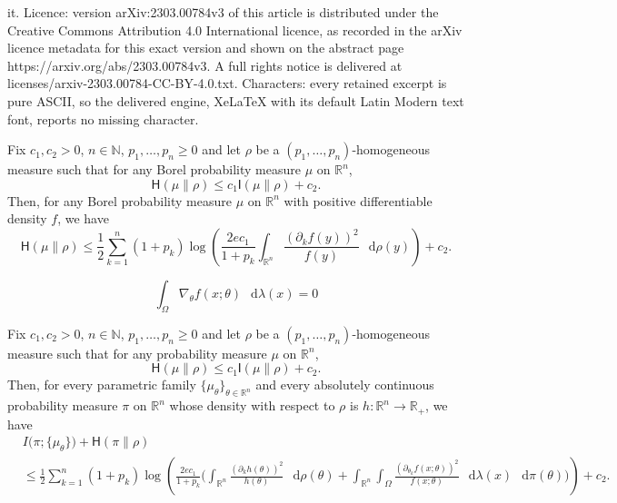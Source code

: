 \documentclass[10pt,a4paper]{amsart}
\newcommand*\diff{\mathop{}\!\mathrm{d}}
\newcommand{\HH}{\mathsf{H}}
\newcommand{\II}{\mathsf{I}}
\newcommand{\N}{\mathbb{N}}
\newcommand{\R}{\mathbb{R}} %
\begin{document}
it. Licence: version arXiv:2303.00784v3 of this article is distributed under the Creative Commons Attribution 4.0 International licence, as recorded in the arXiv licence metadata for this exact version and shown on the abstract page https://arxiv.org/abs/2303.00784v3. A full rights notice is delivered at licenses/arxiv-2303.00784-CC-BY-4.0.txt. Characters: every retained excerpt is pure ASCII, so the delivered engine, XeLaTeX with its default Latin Modern text font, reports no missing character.
\begin{theorem} \label{thm:homogeneous}
Fix $c_1,c_2>0$, $n\in\N$, $p_1,\ldots,p_n\geq0$ and let $\rho$ be a $(p_1,\ldots,p_n)$-homogeneous measure such that for any Borel probability measure $\mu$ on $\R^n$,
\begin{equation} \label{eq:homog-assumption}
\HH(\mu\|\rho)\leq c_1 \II(\mu\|\rho) + c_2.
\end{equation} 
Then, for any Borel probability measure $\mu$ on $\R^n$ with  positive differentiable density $f$, we have
\begin{equation}\label{eq:homog-conclusion}
\HH(\mu\|\rho)\leq  \frac{1}{2} \sum_{k=1}^n (1+p_k)  \log\left( \frac{2ec_1}{1+p_k} \int_{\R^n} \frac{(\partial_k f(y))^2}{f(y)} \,\diff\rho(y)\right) + c_2.
\end{equation}
\end{theorem}

\begin{equation} \label{eq:regu}
\int_\Omega \nabla_\theta f(x;\theta) \,\diff\lambda(x) = 0
\end{equation}

\begin{theorem} \label{thm:cramer-rao}
Fix $c_1,c_2>0$, $n\in\N$, $p_1,\ldots,p_n\geq0$ and let $\rho$ be a $(p_1,\ldots,p_n)$-homogeneous measure  such that for any probability measure $\mu$ on $\R^n$,
\begin{equation} \label{eq:cr-assumption}
\HH(\mu\|\rho)\leq c_1 \II(\mu\|\rho) + c_2.
\end{equation}
Then, for every parametric family $\{\mu_\theta\}_{\theta\in\R^n}$ and every absolutely continuous probability measure $\pi$ on $\R^n$ whose density with respect to $\rho$ is $h:\R^n\to\R_+$, we have
\begin{equation}
\begin{split}
&I\big(\pi;\{\mu_\theta\}\big)+ \HH(\pi\|\rho)
\\& \leq \frac{1}{2}\sum_{k=1}^n (1+p_k) \log\left( \frac{2ec_1}{1+p_k}\Big(\int_{\R^n} \frac{(\partial_{k} h(\theta))^2}{h(\theta)}\,\diff\rho(\theta) + \int_{\R^n} \int_\Omega \frac{(\partial_{\theta_k} f(x;\theta))^2}{f(x;\theta)} \,\diff\lambda(x)\,\diff\pi(\theta)\Big) \right) + c_2.
\end{split}
\end{equation}
\end{theorem}
\end{document}
